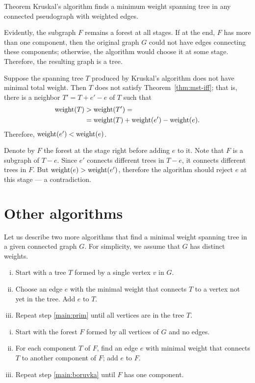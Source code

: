 \begin{thm}{Theorem}\label{thm:kruskal}
Kruskal’s algorithm finds a minimum weight spanning tree in any connected pseudograph with weighted edges.
\end{thm}

Evidently, the subgraph $F$ remains a forest at all stages.
If at the end, $F$ has more than one component, then the original graph $G$ could not have edges connecting these components;
otherwise, the algorithm would choose it at some stage.
Therefore, the resulting graph is a tree.

Suppose the spanning tree $T$ produced by Kruskal’s algorithm does not have minimal total weight.
Then $T$ does not satisfy Theorem~\ref{thm:mst-iff};
that is, there is a neighbor $T'=T+e'-e$ of $T$ such that 
\begin{align*}
\mathop{\rm weight}\nolimits(T)&>\mathop{\rm weight}\nolimits(T')=
\\
&=\mathop{\rm weight}\nolimits(T)+\mathop{\rm weight}\nolimits(e')-\mathop{\rm weight}\nolimits(e).
\end{align*}
Therefore, $\mathop{\rm weight}\nolimits(e')<\mathop{\rm weight}\nolimits(e)$.

Denote by $F$ the forest at the stage right before adding $e$ to it.
Note that $F$ is a subgraph of $T-e$.
Since $e'$ connects different trees in $T-e$,
it connects different trees in $F$.
But $\mathop{\rm weight}\nolimits(e)>\mathop{\rm weight}\nolimits(e')$, therefore the algorithm should reject $e$ at this stage --- a contradiction.
\qeds

\section{Other algorithms}

Let us describe two more algorithms that find  a minimal weight spanning tree in a given connected graph $G$.
For simplicity, we assume that $G$ has distinct weights.

\begin{enumerate}[(i)]
\item Start with a tree $T$ formed by a single vertex $v$ in $G$.
\item\label{main:prim} Choose an edge $e$ with the minimal weight that connects $T$ to a vertex not yet in the tree.
Add $e$ to $T$.
\item Repeat step \ref{main:prim} until all vertices are in the tree $T$.
\end{enumerate}

\begin{enumerate}[(i)]
\item Start with the forest $F$ formed by all vertices of $G$ and no edges.
\item\label{main:boruvka} For each component $T$ of $F$, find an edge $e$ with minimal weight that connects $T$ to another component of $F$; add $e$ to $F$.
\item Repeat step \ref{main:boruvka} until $F$ has one component. 
\end{enumerate}

